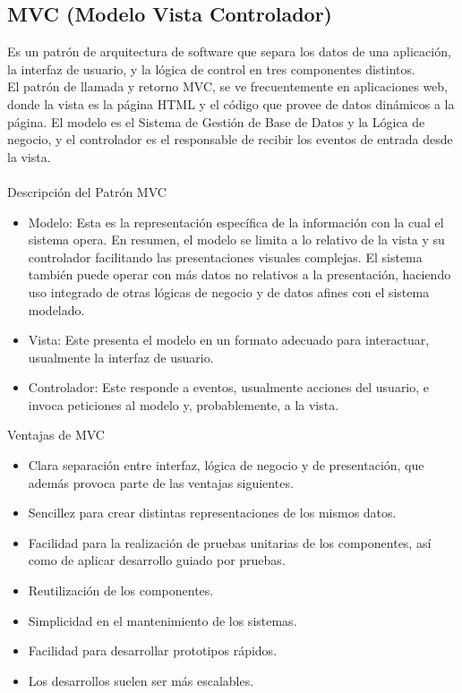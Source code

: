 \documentclass[10pt,a4paper]{report}
\begin{document}
\subsection{MVC (Modelo Vista Controlador)}
\bigskip
Es un patr\'{o}n de arquitectura de software que separa los datos de una aplicaci\'{o}n, la interfaz de usuario, y la l\'{o}gica de control en tres componentes distintos.\\

El patr\'{o}n de llamada y retorno MVC, se ve frecuentemente en aplicaciones web, donde la vista es la p\'{a}gina HTML y el c\'{o}digo que provee de datos din\'{a}micos a la p\'{a}gina. El modelo es el Sistema de Gesti\'{o}n de Base de Datos y la L\'{o}gica de negocio, y el controlador es el responsable de recibir los eventos de entrada desde la vista.\\\\

Descripci\'{o}n del Patr\'{o}n MVC
\bigskip
\begin{itemize}

\item Modelo: Esta es la representaci\'{o}n específica de la informaci\'{o}n con la cual el sistema opera. En resumen, el modelo se limita a lo relativo de la vista y su controlador facilitando las presentaciones visuales complejas. El sistema tambi\'{e}n puede operar con m\'{a}s datos no relativos a la presentaci\'{o}n, haciendo uso integrado de otras l\'{o}gicas de negocio y de datos afines con el sistema modelado.

\item Vista: Este presenta el modelo en un formato adecuado para interactuar, usualmente la interfaz de usuario.

\item Controlador: Este responde a eventos, usualmente acciones del usuario, e invoca peticiones al modelo y, probablemente, a la vista.
\end{itemize}
\bigskip
\newpage

Ventajas de MVC\
\begin{itemize}
\item Clara separaci\'{o}n entre interfaz, l\'{o}gica de negocio y de presentaci\'{o}n, que adem\'{a}s provoca parte de las ventajas siguientes.
\item Sencillez para crear distintas representaciones de los mismos datos.
\item Facilidad para la realizaci\'{o}n de pruebas unitarias de los componentes, as\'{i} como de aplicar desarrollo guiado por pruebas.
\item Reutilizaci\'{o}n de los componentes.
\item Simplicidad en el mantenimiento de los sistemas.
\item Facilidad para desarrollar prototipos r\'{a}pidos.
\item Los desarrollos suelen ser m\'{a}s escalables.\\\\
\end{itemize}
\end{document}
